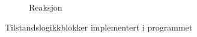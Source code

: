 \begin{figure}[htbp]
\begin{subfigure}[b]{0.3\textwidth}
        \caption{Reaksjon}\label{fig:fbReaksjon}
    \end{subfigure}
    \caption{Tilstandslogikkblokker implementert i programmet}\label{fig:ReaksjonsFasen}
\end{figure}



